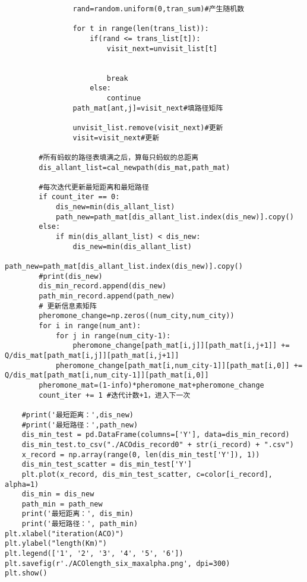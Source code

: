 \begin{lstlisting}
                rand=random.uniform(0,tran_sum)#产生随机数

                for t in range(len(trans_list)):
                    if(rand <= trans_list[t]):
                        visit_next=unvisit_list[t]


                        break
                    else:
                        continue
                path_mat[ant,j]=visit_next#填路径矩阵

                unvisit_list.remove(visit_next)#更新
                visit=visit_next#更新

        #所有蚂蚁的路径表填满之后，算每只蚂蚁的总距离
        dis_allant_list=cal_newpath(dis_mat,path_mat)

        #每次迭代更新最短距离和最短路径
        if count_iter == 0:
            dis_new=min(dis_allant_list)
            path_new=path_mat[dis_allant_list.index(dis_new)].copy()
        else:
            if min(dis_allant_list) < dis_new:
                dis_new=min(dis_allant_list)
                path_new=path_mat[dis_allant_list.index(dis_new)].copy()
        #print(dis_new)
        dis_min_record.append(dis_new)
        path_min_record.append(path_new)
        # 更新信息素矩阵
        pheromone_change=np.zeros((num_city,num_city))
        for i in range(num_ant):
            for j in range(num_city-1):
                pheromone_change[path_mat[i,j]][path_mat[i,j+1]] += Q/dis_mat[path_mat[i,j]][path_mat[i,j+1]]
            pheromone_change[path_mat[i,num_city-1]][path_mat[i,0]] += Q/dis_mat[path_mat[i,num_city-1]][path_mat[i,0]]
        pheromone_mat=(1-info)*pheromone_mat+pheromone_change
        count_iter += 1 #迭代计数+1，进入下一次

    #print('最短距离：',dis_new)
    #print('最短路径：',path_new)
    dis_min_test = pd.DataFrame(columns=['Y'], data=dis_min_record)
    dis_min_test.to_csv("./ACOdis_record0" + str(i_record) + ".csv")
    x_record = np.array(range(0, len(dis_min_test['Y']), 1))
    dis_min_test_scatter = dis_min_test['Y']
    plt.plot(x_record, dis_min_test_scatter, c=color[i_record], alpha=1)
    dis_min = dis_new
    path_min = path_new
    print('最短距离：', dis_min)
    print('最短路径：', path_min)
plt.xlabel("iteration(ACO)")
plt.ylabel("length(Km)")
plt.legend(['1', '2', '3', '4', '5', '6'])
plt.savefig(r'./ACOlength_six_maxalpha.png', dpi=300)
plt.show()
\end{lstlisting}

